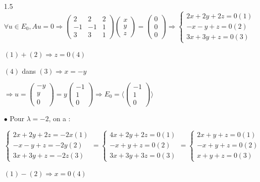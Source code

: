 \documentclass[12pt]{article}
\begin{document}
\begin{spacing}{1.5}
$\forall u\in E_0,Au=0\Rightarrow \begin{pmatrix}
2 & 2& 2 \\ 
-1 & -1 & 1 \\ 
3 & 3 & 1
\end{pmatrix}\begin{pmatrix}
x\\
y\\
z
\end{pmatrix}=\begin{pmatrix}
0\\
0\\
0
\end{pmatrix}\Rightarrow \begin{cases}
2x+2y+2z=0(1)\\
-x-y+z=0(2)\\
3x+3y+z=0(3)
\end{cases}$

$(1)+(2)\Longrightarrow z=0 (4)$

$(4)$ dans $(3)\Longrightarrow x=-y$

$\Rightarrow u=\begin{pmatrix}
-y\\
y\\
0
\end{pmatrix}=y\begin{pmatrix}
-1\\
1  \\
0
\end{pmatrix}\Rightarrow E_0=\langle \begin{pmatrix}
-1\\
1\\
0
\end{pmatrix}\rangle$

$\bullet$ Pour $\lambda=-2$, on a :

$\begin{cases}
2x+2y+2z=-2x(1)\\
-x-y+z=-2y(2)\\
3x+3y+z=-2z(3)
\end{cases}=\begin{cases}
4x+2y+2z=0(1)\\
-x+y+z=0(2)\\
3x+3y+3z=0(3)
\end{cases}=\begin{cases}
2x+y+z=0(1)\\
-x+y+z=0(2)\\
x+y+z=0(3)
\end{cases}$

$(1)-(2)\Rightarrow x=0 (4)$


\end{spacing}
\end{document}
